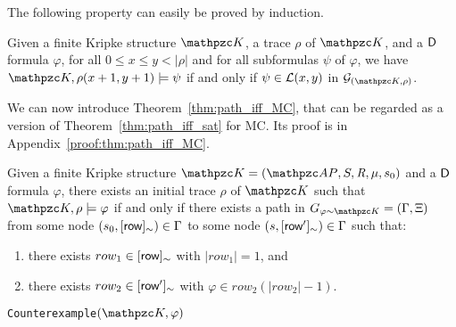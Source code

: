 The following property can easily be proved by induction.
\begin{proposition}\label{prop:eqTrack}
Given a finite Kripke structure $\Ku$, a trace $\rho$ of $\Ku$, and a $\mathsf{D}$ formula $\varphi$, 
for all $0\leq x\leq y <|\rho|$ and for all subformulas $\psi$ of $\varphi$, we have 
$\Ku,\rho(x+1,y+1)\models \psi$ if and only if $\psi\in\mathcal{L}(x,y)$ in $\cG_{(\Ku,\rho)}$.
\end{proposition}
%
%
We can now introduce Theorem~\ref{thm:path_iff_MC}, that can be regarded as a version of Theorem~\ref{thm:path_iff_sat} for MC.
Its proof is in Appendix~\ref{proof:thm:path_iff_MC}.
\begin{theorem}\label{thm:path_iff_MC}
Given a finite Kripke structure $\Ku=\KuDef$ and a $\mathsf{D}$ formula $\varphi$, 
there exists an initial trace $\rho$ of $\Ku$ such that $\Ku,\rho\models\varphi$
if and only if
there exists
a path  in $G_{\varphi \sim\Ku}=(\Gamma, \Xi)$
from some node $(s_0,[\text{{\sffamily row}}]_\sim)\in\Gamma$ to some node $(s,[\text{{\sffamily row}}']_\sim)\in\Gamma$ such that:
\begin{enumerate}
    \item there exists $row_1\in[\text{{\sffamily row}}]_\sim$ with $|row_1|=1$, and
    \item there exists $row_2\in[\text{{\sffamily row}}']_\sim$ with $\varphi\in row_2(|row_2|-1)$.
\end{enumerate}
\end{theorem} 
%

\begin{algorithm}[t]
\caption{\texttt{Counterexample}$(\Ku,\varphi)$}\label{NDAlgoMC}
\begin{algorithmic}[1]
    \EndIf
    \EndIf
\end{algorithmic}
\end{algorithm}

